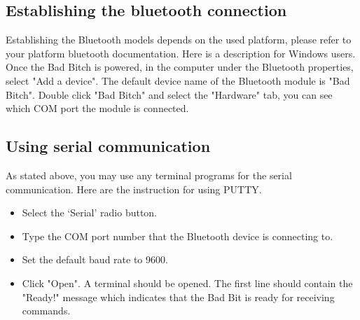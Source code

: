 \documentclass[letterpaper, 12 pt]{article}
\begin{document}
\subsection{Establishing the bluetooth connection}
Establishing the Bluetooth models depends on the used platform, please refer to your platform bluetooth documentation. Here is a description for Windows users. Once the Bad Bitch is powered, in the computer under the Bluetooth properties, select "Add a device". The default device name of the Bluetooth module is "Bad Bitch". Double click "Bad Bitch" and select the "Hardware" tab, you can see which COM port the module is connected.
\subsection{Using serial communication}
As stated above, you may use any terminal programs for the serial communication. Here are the instruction for using PUTTY.
\begin{itemize}
\item Select the ‘Serial’ radio button.
\item Type the COM port number that the Bluetooth device is connecting to.
\item Set the default baud rate to 9600.
\item Click "Open". A terminal should be opened. The first line should contain the "Ready!" message which indicates that the Bad Bit is ready for receiving commands.
\end{itemize}
\end{document}
